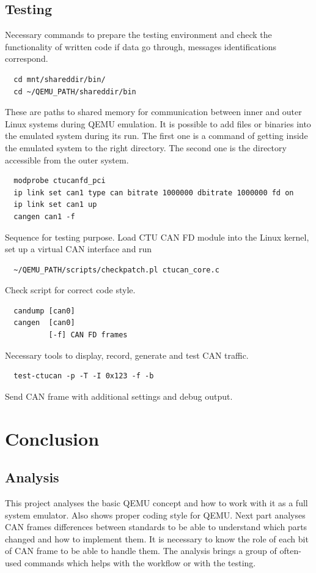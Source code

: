 \documentclass{ctuthesis}
\begin{document}
 \section{Testing}
 Necessary commands to prepare the testing environment and check the functionality of written code if data go through, messages identifications correspond.
 \begin{verbatim}  cd mnt/shareddir/bin/
  cd ~/QEMU_PATH/shareddir/bin\end{verbatim}
 These are paths to shared memory for communication between inner and outer Linux systems during QEMU emulation. It is possible to add files or binaries into the emulated system during its run. The first one is a command of getting inside the emulated system to the right directory. The second one is the directory accessible from the outer system.
 \begin{verbatim}  modprobe ctucanfd_pci
  ip link set can1 type can bitrate 1000000 dbitrate 1000000 fd on
  ip link set can1 up
  cangen can1 -f\end{verbatim}
 Sequence for testing purpose. Load CTU CAN FD module into the Linux kernel, set up a virtual CAN interface and run
 \begin{verbatim}  ~/QEMU_PATH/scripts/checkpatch.pl ctucan_core.c\end{verbatim}
 Check script for correct code style.
 \begin{verbatim}  candump [can0]
  cangen  [can0]
          [-f] CAN FD frames\end{verbatim}
 Necessary tools to display, record, generate and test CAN traffic. \cite{can-utils}
 \begin{verbatim}  test-ctucan -p -T -I 0x123 -f -b\end{verbatim}
 Send CAN frame with additional settings and debug output.
 
 
\chapter{Conclusion}
 \section{Analysis}
 This project analyses the basic QEMU concept and how to work with it as a full system emulator. Also shows proper coding style for QEMU.  Next part analyses CAN frames differences between standards to be able to understand which parts changed and how to implement them. It is necessary to know the role of each bit of CAN frame to be able to handle them. The analysis brings a group of often-used commands which helps with the workflow or with the testing.
\end{document}
